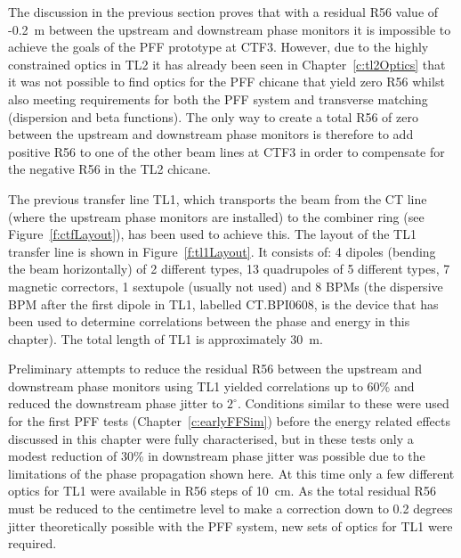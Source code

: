 
The discussion in the previous section proves that with a residual R56 value of -0.2~m between the upstream and downstream phase monitors it is impossible to achieve the goals of the PFF prototype at CTF3. However, due to the highly constrained optics in TL2 it has already been seen in Chapter~\ref{c:tl2Optics} that it was not possible to find optics for the PFF chicane that yield zero R56 whilst also meeting requirements for both the PFF system and transverse matching (dispersion and beta functions). The only way to create a total R56 of zero between the upstream and downstream phase monitors is therefore to add positive R56 to one of the other beam lines at CTF3 in order to compensate for the negative R56 in the TL2 chicane. 

The previous transfer line TL1, which transports the beam from the CT line (where the upstream phase monitors are installed) to the combiner ring (see Figure~\ref{f:ctfLayout}), has been used to achieve this. The layout of the TL1 transfer line is shown in Figure~\ref{f:tl1Layout}. It consists of: 4 dipoles (bending the beam horizontally) of 2 different types, 13 quadrupoles of 5 different types, 7 magnetic correctors, 1 sextupole (usually not used) and 8 BPMs (the dispersive BPM after the first dipole in TL1, labelled CT.BPI0608, is the device that has been used to determine correlations between the phase and energy in this chapter). The total length of TL1 is approximately 30~m.

Preliminary attempts to reduce the residual R56 between the upstream and downstream phase monitors using TL1 yielded correlations up to 60\% and reduced the downstream phase jitter to \(2^\circ\). Conditions similar to these were used for the first PFF tests (Chapter~\ref{c:earlyFFSim}) before the energy related effects discussed in this chapter were fully characterised, but in these tests only a modest reduction of 30\% in downstream phase jitter was possible due to the limitations of the phase propagation shown here. At this time only a few different optics for TL1 were available in R56 steps of 10~cm. As the total residual R56 must be reduced to the centimetre level to make a correction down to 0.2 degrees jitter theoretically possible with the PFF system, new sets of optics for TL1 were required.

